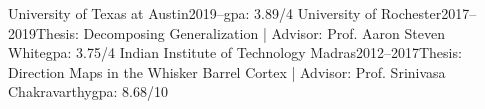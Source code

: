     {University of Texas at Austin}{2019--}{}{\rmsc gpa: 3.89/4}
    {University of Rochester}{2017--2019}{Thesis: Decomposing Generalization | Advisor: Prof. Aaron Steven White}{\rmsc gpa: 3.75/4}
    {Indian Institute of Technology Madras}{2012--2017}{Thesis: Direction Maps in the Whisker Barrel Cortex | Advisor: Prof. Srinivasa Chakravarthy}{\rmsc gpa: 8.68/10}